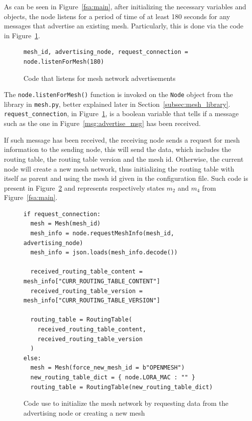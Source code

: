 				As can be seen in Figure~\ref{fsa:main}, after initializing the necessary variables and objects, the node listens for a period of time of at least 180 seconds for any messages that advertise an existing mesh.
				Particularly, this is done via the code in Figure~\ref{code:mesh_init_1}.

				\begin{figure}[H]
					\begin{lstlisting}
mesh_id, advertising_node, request_connection = node.listenForMesh(180)
					\end{lstlisting}		
					\label{code:mesh_init_1}
					\caption{Code that listens for mesh network advertisements}
				\end{figure}
			
				The \texttt{node.listenForMesh()} function is invoked on the \texttt{Node} object from the library in \texttt{mesh.py}, better explained later in Section~\ref{subsec:mesh_library}.				
				\texttt{request\_connection}, in Figure~\ref{code:mesh_init_1}, is a boolean variable that tells if a message such as the one in Figure~\ref{msg:advertise_msg} has been received.
				
				
				If such message has been received, the receiving node sends a request for mesh information to the sending node, this will send the data, which includes the routing table, the routing table version and the mesh id.
				Otherwise, the current node will create a new mesh network, thus initializing the routing table with itself as parent and using the mesh id given in the configuration file.
				Such code is present in Figure~\ref{code:mesh_init_2} and represents respectively states $m_{2}$ and $m_{4}$ from Figure~\ref{fsa:main}.
									
				\begin{figure}	
					\begin{lstlisting}
if request_connection:
  mesh = Mesh(mesh_id)
  mesh_info = node.requestMeshInfo(mesh_id, advertising_node)
  mesh_info = json.loads(mesh_info.decode())

  received_routing_table_content = mesh_info["CURR_ROUTING_TABLE_CONTENT"]
  received_routing_table_version = mesh_info["CURR_ROUTING_TABLE_VERSION"]
  
  routing_table = RoutingTable(
    received_routing_table_content, 
    received_routing_table_version
  )
else:
  mesh = Mesh(force_new_mesh_id = b"OPENMESH")
  new_routing_table_dict = { node.LORA_MAC : "" }
  routing_table = RoutingTable(new_routing_table_dict)
					\end{lstlisting}
					\label{code:mesh_init_2}
					\caption{Code use to initialize the mesh network by requesting data from the advertising node or creating a new mesh}
				\end{figure}
			
